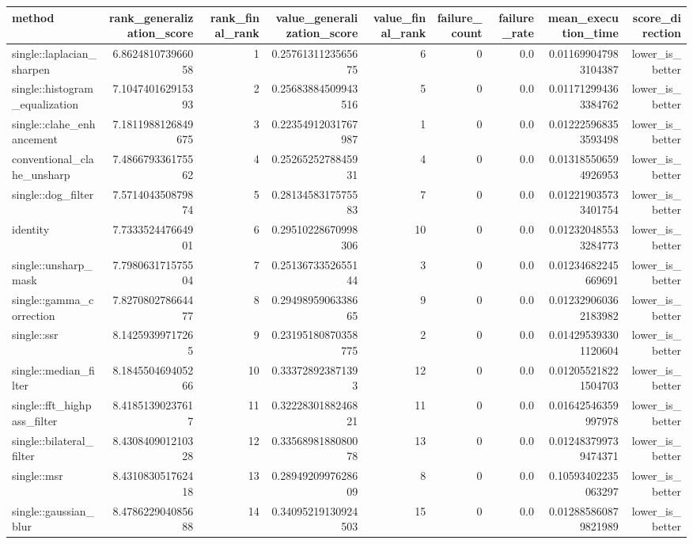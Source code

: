 \begin{tabular}{lrrrrrrrr}
\hline
method & rank\_generalization\_score & rank\_final\_rank & value\_generalization\_score & value\_final\_rank & failure\_count & failure\_rate & mean\_execution\_time & score\_direction \\
\hline
single::laplacian\_sharpen & 6.862481073966058 & 1 & 0.2576131123565675 & 6 & 0 & 0.0 & 0.011699047983104387 & lower\_is\_better \\
single::histogram\_equalization & 7.104740162915393 & 2 & 0.25683884509943516 & 5 & 0 & 0.0 & 0.011712994363384762 & lower\_is\_better \\
single::clahe\_enhancement & 7.1811988126849675 & 3 & 0.22354912031767987 & 1 & 0 & 0.0 & 0.012225968353593498 & lower\_is\_better \\
conventional\_clahe\_unsharp & 7.486679336175562 & 4 & 0.2526525278845931 & 4 & 0 & 0.0 & 0.013185506594926953 & lower\_is\_better \\
single::dog\_filter & 7.571404350879874 & 5 & 0.2813458317575583 & 7 & 0 & 0.0 & 0.012219035733401754 & lower\_is\_better \\
identity & 7.733352447664901 & 6 & 0.29510228670998306 & 10 & 0 & 0.0 & 0.012320485533284773 & lower\_is\_better \\
single::unsharp\_mask & 7.798063171575504 & 7 & 0.2513673352655144 & 3 & 0 & 0.0 & 0.01234682245669691 & lower\_is\_better \\
single::gamma\_correction & 7.827080278664477 & 8 & 0.2949895906338665 & 9 & 0 & 0.0 & 0.012329060362183982 & lower\_is\_better \\
single::ssr & 8.14259399717265 & 9 & 0.23195180870358775 & 2 & 0 & 0.0 & 0.014295393301120604 & lower\_is\_better \\
single::median\_filter & 8.184550469405266 & 10 & 0.333728923871393 & 12 & 0 & 0.0 & 0.012055218221504703 & lower\_is\_better \\
single::fft\_highpass\_filter & 8.41851390237617 & 11 & 0.3222830188246821 & 11 & 0 & 0.0 & 0.01642546359997978 & lower\_is\_better \\
single::bilateral\_filter & 8.430840901210328 & 12 & 0.3356898188080078 & 13 & 0 & 0.0 & 0.012483799739474371 & lower\_is\_better \\
single::msr & 8.431083051762418 & 13 & 0.2894920997628609 & 8 & 0 & 0.0 & 0.10593402235063297 & lower\_is\_better \\
single::gaussian\_blur & 8.478622904085688 & 14 & 0.34095219130924503 & 15 & 0 & 0.0 & 0.012885860879821989 & lower\_is\_better \\

\end{tabular}
